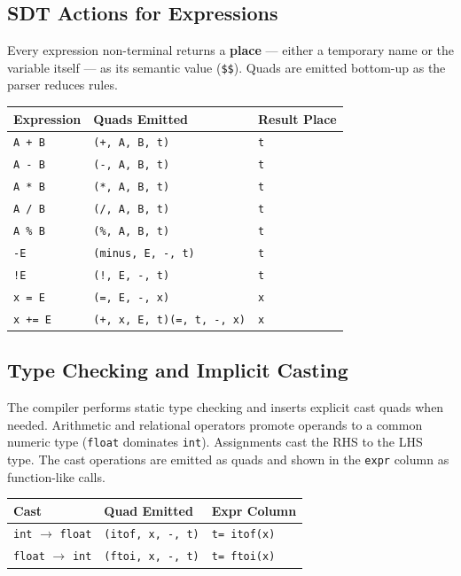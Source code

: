 \documentclass[11pt]{article}
\begin{document}
\subsection{SDT Actions for Expressions}

Every expression non-terminal returns a \textbf{place} --- either a temporary name or the variable itself --- as its semantic value (\texttt{\$\$}). Quads are emitted bottom-up as the parser reduces rules.

\begin{center}
\renewcommand{\arraystretch}{1.4}
\begin{tabular}{@{}lll@{}}
\toprule
\textbf{Expression} & \textbf{Quads Emitted} & \textbf{Result Place} \\
\midrule
\texttt{A + B} & \texttt{(+, A, B, t)} & \texttt{t} \\
\texttt{A - B} & \texttt{(-, A, B, t)} & \texttt{t} \\
\texttt{A * B} & \texttt{(*, A, B, t)} & \texttt{t} \\
\texttt{A / B} & \texttt{(/, A, B, t)} & \texttt{t} \\
\texttt{A \% B} & \texttt{(\%, A, B, t)} & \texttt{t} \\
\texttt{-E}    & \texttt{(minus, E, -, t)} & \texttt{t} \\
\texttt{!E}    & \texttt{(!, E, -, t)} & \texttt{t} \\
\texttt{x = E} & \texttt{(=, E, -, x)} & \texttt{x} \\
\texttt{x += E}& \texttt{(+, x, E, t)}\quad\texttt{(=, t, -, x)} & \texttt{x} \\
\bottomrule
\end{tabular}
\end{center}

\subsection{Type Checking and Implicit Casting}

The compiler performs static type checking and inserts explicit cast quads when needed. Arithmetic and relational operators promote operands to a common numeric type (\texttt{float} dominates \texttt{int}). Assignments cast the RHS to the LHS type. The cast operations are emitted as quads and shown in the \texttt{expr} column as function-like calls.

\begin{center}
\renewcommand{\arraystretch}{1.3}
\begin{tabular}{@{}lll@{}}
\toprule
\textbf{Cast} & \textbf{Quad Emitted} & \textbf{Expr Column} \\
\midrule
\texttt{int} $\rightarrow$ \texttt{float} & \texttt{(itof, x, -, t)} & \texttt{t= itof(x)} \\
\texttt{float} $\rightarrow$ \texttt{int} & \texttt{(ftoi, x, -, t)} & \texttt{t= ftoi(x)} \\
\bottomrule
\end{tabular}
\end{center}
\end{document}
